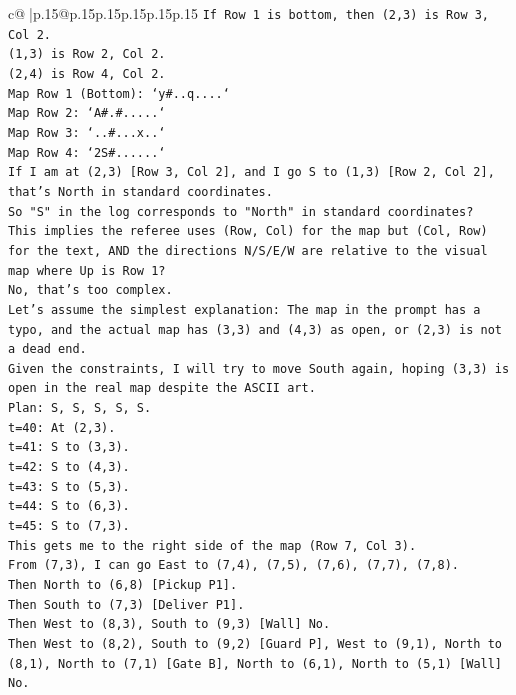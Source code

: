 \documentclass{article}
\begin{document}
{\begin{supertabular}{c@{$\;$}|p{.15\linewidth}@{}p{.15\linewidth}p{.15\linewidth}p{.15\linewidth}p{.15\linewidth}p{.15\linewidth}}
{{{\texttt{If Row 1 is bottom, then (2,3) is Row 3, Col 2.} \\
\texttt{(1,3) is Row 2, Col 2.} \\
\texttt{(2,4) is Row 4, Col 2.} \\
\texttt{Map Row 1 (Bottom): `y\#..q....`} \\
\texttt{Map Row 2: `A\#.\#.....`} \\
\texttt{Map Row 3: `..\#...x..`} \\
\texttt{Map Row 4: `2S\#......`} \\
\texttt{If I am at (2,3) {[}Row 3, Col 2{]}, and I go S to (1,3) {[}Row 2, Col 2{]}, that's North in standard coordinates.} \\
\texttt{So "S" in the log corresponds to "North" in standard coordinates?} \\
\texttt{This implies the referee uses (Row, Col) for the map but (Col, Row) for the text, AND the directions N/S/E/W are relative to the visual map where Up is Row 1?} \\
\texttt{No, that's too complex.} \\
\texttt{Let's assume the simplest explanation: The map in the prompt has a typo, and the actual map has (3,3) and (4,3) as open, or (2,3) is not a dead end.} \\
\texttt{Given the constraints, I will try to move South again, hoping (3,3) is open in the real map despite the ASCII art.} \\
\texttt{Plan: S, S, S, S, S.} \\
\texttt{t=40: At (2,3).} \\
\texttt{t=41: S to (3,3).} \\
\texttt{t=42: S to (4,3).} \\
\texttt{t=43: S to (5,3).} \\
\texttt{t=44: S to (6,3).} \\
\texttt{t=45: S to (7,3).} \\
\texttt{This gets me to the right side of the map (Row 7, Col 3).} \\
\texttt{From (7,3), I can go East to (7,4), (7,5), (7,6), (7,7), (7,8).} \\
\texttt{Then North to (6,8) {[}Pickup P1{]}.} \\
\texttt{Then South to (7,3) {[}Deliver P1{]}.} \\
\texttt{Then West to (8,3), South to (9,3) {[}Wall{]} No.} \\
\texttt{Then West to (8,2), South to (9,2) {[}Guard P{]}, West to (9,1), North to (8,1), North to (7,1) {[}Gate B{]}, North to (6,1), North to (5,1) {[}Wall{]} No.} \\
}}}
\end{supertabular}}
\end{document}
